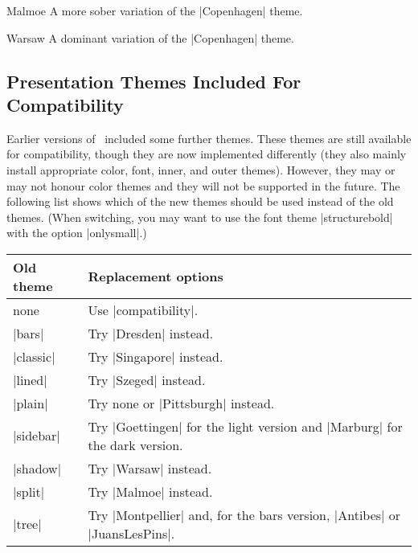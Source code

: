\begin{themeexample}{Malmoe}
  A more sober variation of the |Copenhagen| theme.
\end{themeexample}


\begin{themeexample}{Warsaw}
  A dominant variation of the |Copenhagen| theme.
\end{themeexample}


\subsection{Presentation Themes Included For Compatibility}

Earlier versions of \beamer\ included some further themes. These
themes are still available for compatibility, though they are now
implemented differently (they also mainly install appropriate color,
font, inner, and outer themes). However, they may or may not honour
color themes and they will not be supported in the future. The
following list shows which of the new themes should be used instead of
the old themes. (When switching, you may want to use the font theme
|structurebold| with the option |onlysmall|.)

\medskip
\begin{tabular}{lp{13cm}}
  Old theme & Replacement options \\\hline
  none & Use |compatibility|. \\
  |bars| & Try |Dresden| instead. \\
  |classic| & Try |Singapore| instead. \\
  |lined| & Try |Szeged| instead. \\
  |plain| & Try none or |Pittsburgh| instead. \\
  |sidebar| & Try |Goettingen| for the light version and |Marburg| for
  the dark version. \\
  |shadow| & Try |Warsaw| instead. \\
  |split| & Try |Malmoe| instead. \\
  |tree| & Try |Montpellier| and, for the bars version, |Antibes| or
  |JuansLesPins|. 
\end{tabular}


